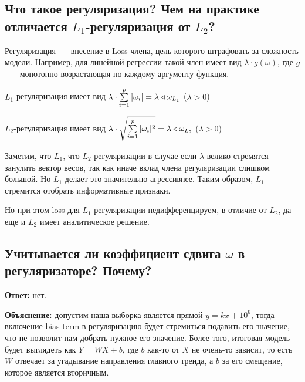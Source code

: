 \subsection{Что такое регуляризация? Чем на практике отличается $L_1$-регуляризация от $L_2$?}

\begin{definition}
    Регуляризация~--- внесение в Loss члена, цель которого штрафовать за сложность модели. Например, для линейной регрессии такой член имеет вид $\lambda \cdot g(\omega)$, где $g$~--- монотонно возрастающая по каждому аргументу функция.
\end{definition}

\begin{definition}
    $L_1$-регуляризация имеет вид $\lambda \cdot \sum\limits_{i = 1}^p |\omega_i| = \lambda\triangleleft{\omega}_{L_1}$ ($\lambda > 0$)
\end{definition}

\begin{definition}
    $L_2$-регуляризация имеет вид $\lambda \cdot \sqrt{\sum\limits_{i = 1}^p |\omega_i|^2} = \lambda\triangleleft{\omega}_{L_2}$ ($\lambda > 0$)
\end{definition}

Заметим, что $L_1$, что $L_2$ регуляризации в случае если $\lambda$ велико стремятся занулить вектор весов, так как иначе вклад члена регуляризации слишком большой. Но $L_1$ делает это значительно агрессивнее. Таким образом, $L_1$ стремится отобрать информативные признаки. 

Но при этом loss для $L_1$ регуляризации недифференцируем, в отличие от $L_2$, да еще и $L_2$ имеет аналитическое решение.








\subsection{Учитывается ли коэффициент сдвига $\omega$ в регуляризаторе? Почему?}

\textbf{Ответ:} нет.

\textbf{Объяснение:} допустим наша выборка является прямой $y = kx + 10^6$, тогда включение bias term в регуляризацию будет стремиться подавить его значение, что не позволит нам добрать нужное его значение. Более того, итоговая модель будет выглядеть как $Y = WX + b$, где $b$ как-то от $X$ не очень-то зависит, то есть $W$ отвечает за угадывание направления главного тренда, а $b$ за его смещение, которое является вторичным.








